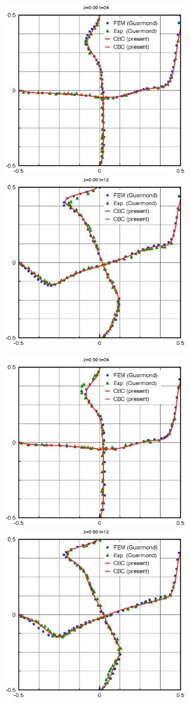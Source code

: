 \begin{figure}[htdp]
\centering
\begin{minipage}{16cm}
\includegraphics[width=8cm]{z00t04.eps}
\includegraphics[width=8cm]{z00t12.eps}
\end{minipage}
\begin{minipage}{16cm}
\includegraphics[width=8cm]{z50t04.eps}
\includegraphics[width=8cm]{z50t12.eps}

\end{minipage}
\end{figure}
